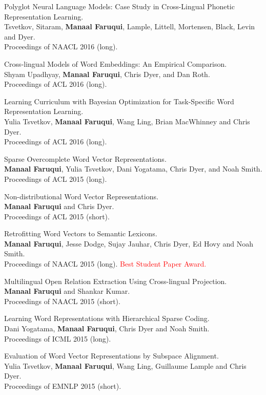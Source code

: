 \documentclass[margin,line]{res}
\begin{document}
\begin{resume}
Polyglot Neural Language Models: Case Study in Cross-Lingual Phonetic Representation Learning.\\
Tsvetkov, Sitaram, \textbf{Manaal Faruqui}, Lample, Littell, Mortensen, Black,  Levin and Dyer.\\
Proceedings of NAACL 2016 (long).

Cross-lingual Models of Word Embeddings: An Empirical Comparison.\\
Shyam Upadhyay, \textbf{Manaal Faruqui}, Chris Dyer, and Dan Roth.\\
Proceedings of ACL 2016 (long).

Learning Curriculum with Bayesian Optimization for Task-Specific Word Representation Learning.\\
Yulia Tsvetkov, \textbf{Manaal Faruqui}, Wang Ling, Brian MacWhinney and Chris Dyer.\\
Proceedings of ACL 2016 (long).

Sparse Overcomplete Word Vector Representations.\\
\textbf{Manaal Faruqui}, Yulia Tsvetkov, Dani Yogatama, Chris Dyer, and Noah Smith.\\
Proceedings of ACL 2015 (long).

Non-distributional Word Vector Representations.\\
\textbf{Manaal Faruqui} and Chris Dyer.\\
Proceedings of ACL 2015 (short).

Retrofitting Word Vectors to Semantic Lexicons.\\
\textbf{Manaal Faruqui}, Jesse Dodge, Sujay Jauhar, Chris Dyer, Ed Hovy and Noah Smith.\\
Proceedings of NAACL 2015 (long). \textcolor{red}{Best Student Paper Award.}

Multilingual Open Relation Extraction Using Cross-lingual Projection.\\
\textbf{Manaal Faruqui} and Shankar Kumar.\\
Proceedings of NAACL 2015 (short).

Learning Word Representations with Hierarchical Sparse Coding.\\
Dani Yogatama, \textbf{Manaal Faruqui}, Chris Dyer and Noah Smith.\\
Proceedings of ICML 2015 (long).

Evaluation of Word Vector Representations by Subspace Alignment.\\
Yulia Tsvetkov, \textbf{Manaal Faruqui}, Wang Ling, Guillaume Lample and Chris Dyer.\\
Proceedings of EMNLP 2015 (short).


\end{resume}
\end{document}
